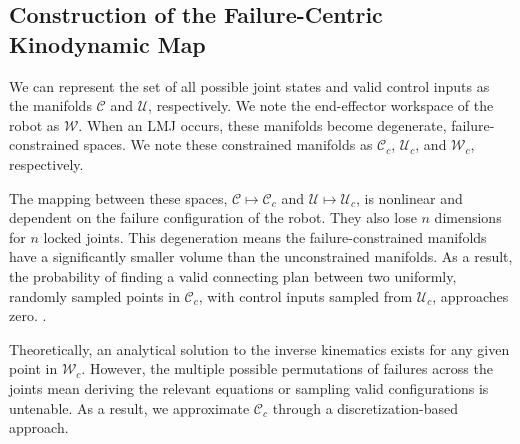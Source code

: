 \subsection{Construction of the Failure-Centric Kinodynamic Map}\label{sec:methods-modeling}


We can represent the set of all possible joint states and valid control inputs as the manifolds $\mathcal{C}$ and $\mathcal{U}$, respectively. We note the end-effector workspace of the robot as $\mathcal{W}$. When an LMJ occurs, these manifolds become degenerate, failure-constrained spaces. We note these constrained manifolds as $\mathcal{C}_c$, $\mathcal{U}_c$, and $\mathcal{W}_c$, respectively. 

The mapping between these spaces, $\mathcal{C} \mapsto \mathcal{C}_c$ and $\mathcal{U} \mapsto \mathcal{U}_c$, is nonlinear and dependent on the failure configuration of the robot. They also lose $n$ dimensions for $n$ locked joints. This degeneration means the failure-constrained manifolds have a significantly smaller volume than the unconstrained manifolds. As a result, the probability of finding a valid connecting plan between two uniformly, randomly sampled points in $\mathcal{C}_c$, with control inputs sampled from $\mathcal{U}_c$, approaches zero. \cite{kingston2018sampling}.

Theoretically, an analytical solution to the inverse kinematics exists for any given point in $\mathcal{W}_c$. However, the multiple possible permutations of failures across the joints mean deriving the relevant equations or sampling valid configurations is untenable. As a result, we approximate $\mathcal{C}_c$ through a discretization-based approach.

